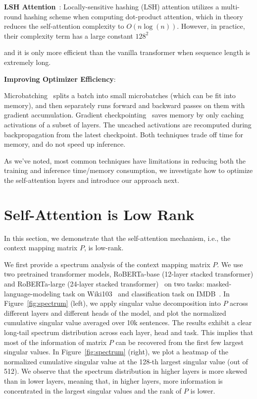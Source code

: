 \textbf{LSH Attention}~\citep{kitaev2019reformer}: Locally-sensitive hashing (LSH) attention utilizes a multi-round hashing scheme when computing dot-product attention, which in theory reduces the self-attention complexity to $O(n\log(n))$. However, in practice, their complexity term has a large constant $128^2$ 

and it is only more efficient than the vanilla transformer when sequence length is extremely long.

\textbf{Improving Optimizer Efficiency}: 

Microbatching~\citep{huang2019gpipe} splits a batch into small microbatches (which can be fit into memory), and then separately runs forward and backward passes on them with gradient accumulation. Gradient checkpointing~\citep{chen2016training} saves memory by only caching activations of a subset of layers. The uncached activations are recomputed during backpropagation from the latest checkpoint. Both techniques trade off time for memory, and do not speed up inference.

As we've noted, most common techniques have limitations in reducing both the training and inference time/memory consumption, we investigate how to optimize the self-attention layers and introduce our approach next.

\section{Self-Attention is Low Rank\label{sec:analysis}}

In this section, we demonstrate that the self-attention mechanism, i.e., the context mapping matrix $P$, is low-rank. 

We first provide a spectrum analysis of the context mapping matrix $P$. We use two pretrained transformer models, RoBERTa-base (12-layer stacked transformer) and RoBERTa-large (24-layer stacked transformer)~\citep{liu2019roberta} on two tasks: masked-language-modeling task on Wiki103~\citep{merity2016pointer} and classification task on IMDB~\citep{maas2011learning}. In Figure~\ref{fig:spectrum} (left), we apply singular value decomposition into $P$ across different layers and different heads of the model, and plot the normalized cumulative singular value averaged over 10k sentences. The results exhibit a clear long-tail spectrum distribution across each layer, head and task. This implies that most of the information of matrix $P$ can be recovered from the first few largest singular values. In Figure~\ref{fig:spectrum} (right), we plot a heatmap of the normalized cumulative singular value at the 128-th largest singular value (out of 512). We observe that the spectrum distribution in higher layers is more skewed than in lower layers, meaning that, in higher layers, more information is concentrated in the largest singular values and the rank of $P$ is lower.


